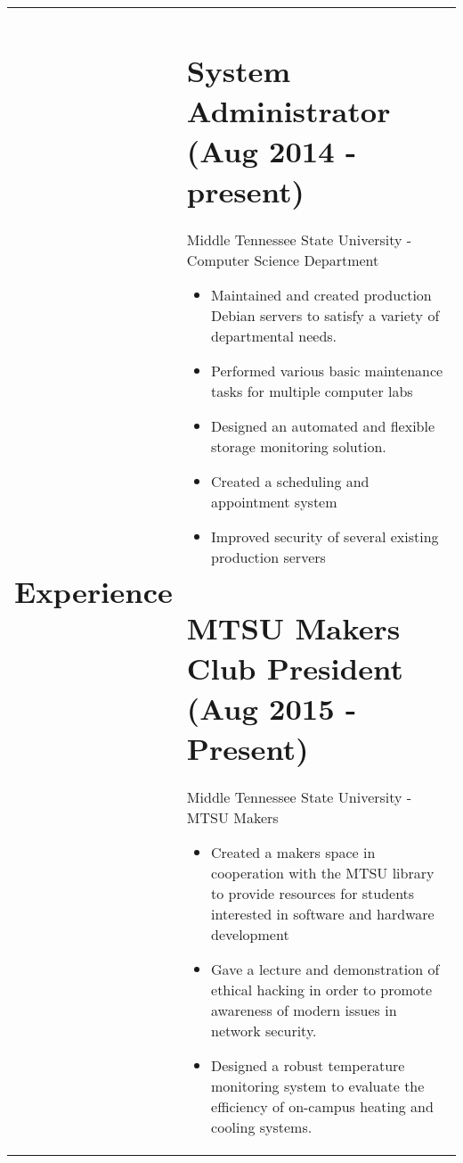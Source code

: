 \documentclass[10pt]{article} %
\begin{document}
\LARGE\noindent{}
\normalsize
\noindent{}
\noindent{}
\noindent{}
\noindent{}
\noindent{}

\hrulefill

\renewcommand\arraystretch{0.1}
\begin{tabularx}{\textwidth}{p{3cm} X}
\section*{Experience}

& \section*{System Administrator (Aug 2014 - present)}
Middle Tennessee State University - Computer Science Department
\begin{itemize}
\setlength{\itemsep}{1pt}
\item Maintained and created production Debian servers to satisfy a variety of departmental needs.
\item Performed various basic maintenance tasks for multiple computer labs
\item Designed an automated and flexible storage monitoring solution.
\item Created a scheduling and appointment system
\item Improved security of several existing production servers
\end{itemize}
\section*{MTSU Makers Club President (Aug 2015 - Present)}
Middle Tennessee State University - MTSU Makers
\begin{itemize}
\setlength{\itemsep}{1pt}
\item Created a makers space in cooperation with the MTSU library to provide resources for students interested in software and hardware development
\item Gave a lecture and demonstration of ethical hacking in order to promote awareness of modern issues in network security.
\item Designed a robust temperature monitoring system to evaluate the efficiency of on-campus heating and cooling systems.
\end{itemize}\\ 

\end{tabularx}
\end{document}
